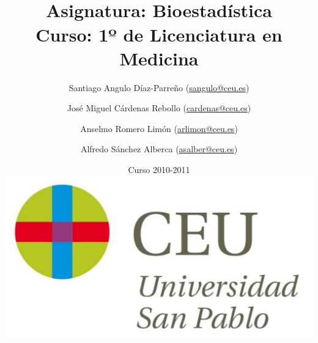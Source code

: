 \documentclass[a4paper,titlepage]{article}
\begin{document}
\sloppy

\title{\vskip 2cm
\shadowbox{\Huge \textbf{\textsf{\quad \textcolor[rgb]{0.00,0.00,0.50}{EJERCICIOS DE ESTADÍSTICA}\quad}}}\\
   \vskip 1cm
   {\Large \textsf{\textcolor[rgb]{0.50,0.00,0.25}{Asignatura: Bioestadística }}}\\
   {\Large \textsf{\textcolor[rgb]{0.50,0.00,0.25}{Curso: 1º de Licenciatura en Medicina}}}
   }
\author{
   Santiago Angulo Díaz-Parreño (\url{sangulo@ceu.es})
   \and
   José Miguel Cárdenas Rebollo (\url{cardenas@ceu.es})
   \and
   Anselmo Romero Limón (\url{arlimon@ceu.es})
   \and
   Alfredo Sánchez Alberca (\url{asalber@ceu.es})
}
\date{Curso 2010-2011\\[1cm]
\includegraphics[scale=0.3]{img/logo_uspceu_01}}

\maketitle
\newpage
\tableofcontents
\newpage








\end{document}
